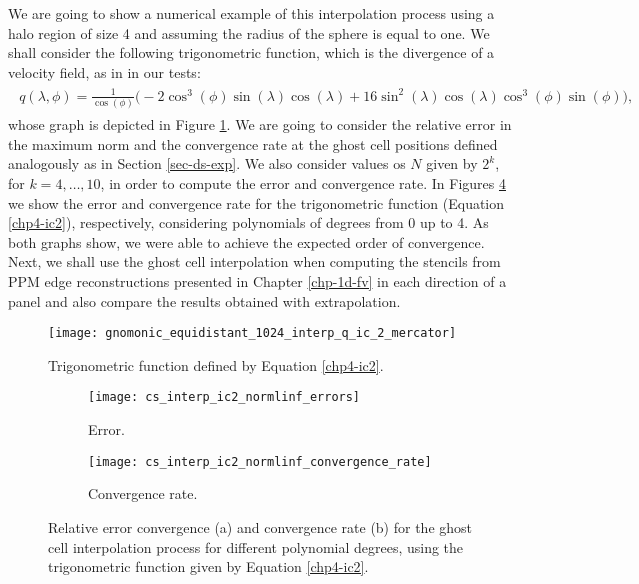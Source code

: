 We are going to show a numerical example of this interpolation process using a halo region of size 4 and 
assuming the radius of the sphere is equal to one.
We shall consider the following trigonometric function, which is the divergence of a velocity field,
as in \citet{peixoto:13} in our tests:
\begin{align}
	\label{chp4-ic2}
	\begin{split}
	q(\lambda, \phi) = \frac{1}{\cos(\phi)}\bigg(-2\cos^3(\phi) \sin(\lambda) \cos(\lambda)
	+16\sin^2(\lambda)\cos(\lambda)\cos^3(\phi)\sin(\phi)\bigg),
	\end{split}
\end{align}
whose graph is depicted in Figure \ref{chp4-cs-ic2}. We are going to consider the relative error in the maximum norm and the convergence rate 
at the ghost cell positions defined analogously as in Section \ref{sec-ds-exp}. 
We also consider values os $N$ given by $2^k$, for $k=4, \ldots, 10$, in order to compute the error and convergence rate.
In Figures \ref{chp4-exp2} we show the error and convergence rate for the trigonometric function (Equation \eqref{chp4-ic2}),
respectively, considering polynomials of degrees from 0 up to 4. As both graphs show, we were able to achieve the expected order of convergence.
Next, we shall use the ghost cell interpolation when computing the stencils from PPM edge reconstructions presented in Chapter \ref{chp-1d-fv}
in each direction of a panel and also compare the results obtained with extrapolation.

\begin{figure}[!htb]
	\centering
	\texttt{[image: gnomonic\_equidistant\_1024\_interp\_q\_ic\_2\_mercator]}
	\caption{Trigonometric function defined by Equation \eqref{chp4-ic2}.}
	\label{chp4-cs-ic2}
\end{figure}

\begin{figure}[!htb]
	\centering
	\begin{subfigure}{0.45\textwidth}
		\centering
		\texttt{[image: cs\_interp\_ic2\_normlinf\_errors]}
		\caption{Error.\label{chp4-exp2-error}}
	\end{subfigure}
	\begin{subfigure}{0.45\textwidth}
		\centering
		\texttt{[image: cs\_interp\_ic2\_normlinf\_convergence\_rate]}
		\caption{Convergence rate.\label{chp4-exp2-CR}}
	\end{subfigure}
	\caption{Relative error convergence (a) and convergence rate (b) for the ghost cell interpolation process for different
		polynomial degrees, using the trigonometric function given by Equation \eqref{chp4-ic2}.\label{chp4-exp2}}
\end{figure}

